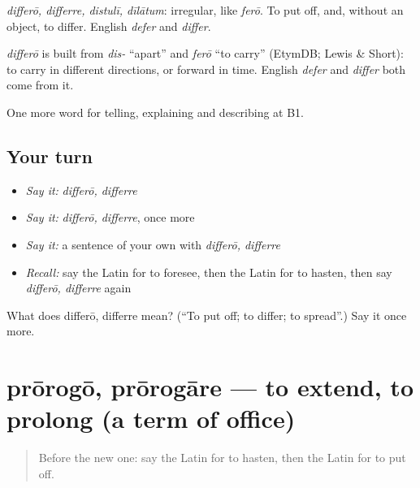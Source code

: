 \emph{differō, differre, distulī, dīlātum}: irregular, like \emph{ferō}. To put off, and, without an object, to differ. English \emph{defer} and \emph{differ}.

\begin{cousinweb}
\emph{differō} is built from \emph{dis-} \textquotedblleft{}apart\textquotedblright{} and \emph{ferō} \textquotedblleft{}to carry\textquotedblright{} (EtymDB; Lewis \& Short): to carry in different directions, or forward in time. English \emph{defer} and \emph{differ} both come from it.
\end{cousinweb}

\begin{grammarlens}[title={What you've built}]
One more word for telling, explaining and describing at B1.
\end{grammarlens}

\subsection*{Your turn}
\begin{itemize}
\raggedright
  \item \emph{Say it:} \emph{differō, differre}
  \item \emph{Say it:} \emph{differō, differre}, once more
  \item \emph{Say it:} a sentence of your own with \emph{differō, differre}
  \item \emph{Recall:} say the Latin for to foresee, then the Latin for to hasten, then say \emph{differō, differre} again
\end{itemize}

\begin{tcolorbox}[breakable,colback=teal!4,colframe=teal!35!black,title={Before you move on}]
What does differō, differre mean? (\textquotedblleft{}To put off; to differ; to spread\textquotedblright{}.) Say it once more.
\end{tcolorbox}
\section[prōrogō, prōrogāre]{prōrogō, prōrogāre — to extend, to prolong (a term of office)}

\label{lesson:LA-C395-prorogo}



\begin{quote}
Before the new one: say the Latin for to hasten, then the Latin for to put off.
\end{quote}

